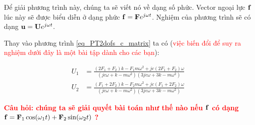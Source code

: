 Để giải phương trình này, chúng ta sẽ viết nó về dạng số phức. Vector ngoại lực ${\bf f}$ lúc này sẽ được biểu diễn ở dạng phức ${\bf f} = {\bf F}e^{j\omega t}$. Nghiệm của phương trình sẽ có dạng ${\bf u} = {\bf U}e^{j\omega t}$.

Thay vào phương trình \cref{eq_PT2dofs_c_matrix} ta có (\textcolor{red}{việc biến đổi để suy ra nghiệm dưới đây là một bài tập dành cho các bạn}):

\begin{equation}\label{eq_nghiemphuc}
    \begin{aligned}
        {U}_1 &=\frac{\left(2 F_1+F_2\right) k-F_1 m \omega^2+j c\left(2 F_1+F_2\right) \omega}{\left(j c \omega+k-m \omega^2\right)\left(3 j c \omega+3 k-m \omega^2\right)}\\
        {U}_2 &=\frac{\left(F_1+2 F_2\right) k-F_2 m \omega^2+j c\left(F_1+2 F_2\right) \omega}{\left(j c \omega+k-m \omega^2\right)\left(3 j c \omega+3 k-m \omega^2\right)}
    \end{aligned}
\end{equation}

\textbf{\textcolor{red}{Câu hỏi: chúng ta sẽ giải quyết bài toán như thế nào nếu ${\bf f}$ có dạng ${\bf f} = {\bf F}_1\cos(\omega_1t) + {\bf F}_2\sin(\omega_2t)$ ?}}

